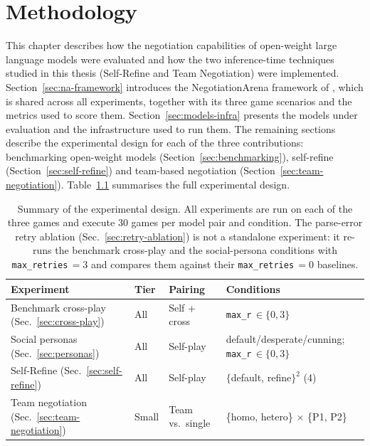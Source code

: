 
\chapter{Methodology} \label{chap:ch3}

This chapter describes how the negotiation capabilities of open-weight large language models were evaluated and how the two inference-time techniques studied in this thesis (Self-Refine and Team Negotiation) were implemented. Section~\ref{sec:na-framework} introduces the NegotiationArena framework of \textcite{bianchi_how_2024}, which is shared across all experiments, together with its three game scenarios and the metrics used to score them. Section~\ref{sec:models-infra} presents the models under evaluation and the infrastructure used to run them. The remaining sections describe the experimental design for each of the three contributions: benchmarking open-weight models (Section~\ref{sec:benchmarking}), self-refine (Section~\ref{sec:self-refine}) and team-based negotiation (Section~\ref{sec:team-negotiation}). Table~\ref{tab:experiment-design} summarises the full experimental design.

\begin{table}
\centering
\small
\caption{Summary of the experimental design. All experiments are run on each of the three games and execute $30$ games per model pair and condition. The parse-error retry ablation (Sec.~\ref{sec:retry-ablation}) is not a standalone experiment: it re-runs the benchmark cross-play and the social-persona conditions with \texttt{max\_retries}\,$=3$ and compares them against their \texttt{max\_retries}\,$=0$ baselines.}
\label{tab:experiment-design}
\begin{tabular}{llll}
\toprule
\textbf{Experiment} & \textbf{Tier} & \textbf{Pairing} & \textbf{Conditions} \\
\midrule
Benchmark cross-play (Sec.~\ref{sec:cross-play})        & All    & Self + cross     & \texttt{max\_r}\,$\in\{0,3\}$   \\
Social personas (Sec.~\ref{sec:personas})               & All & Self-play        & default/desperate/cunning; \texttt{max\_r}\,$\in\{0,3\}$ \\
Self-Refine (Sec.~\ref{sec:self-refine})                & All & Self-play        & $\{$default, refine$\}^2$ (4)         \\
Team negotiation (Sec.~\ref{sec:team-negotiation})      & Small  & Team vs.\ single & \{homo, hetero\} $\times$ \{P1, P2\}  \\
\bottomrule
\end{tabular}
\end{table}

